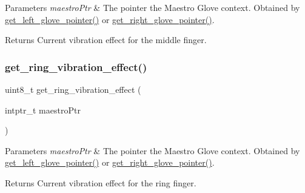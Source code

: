 \begin{DoxyParams}{Parameters}
{\em maestro\+Ptr} & The pointer the Maestro Glove context. Obtained by \hyperlink{group__glove_management_ga63ce3c99d4a8b8db851b22af9185764e}{get\+\_\+left\+\_\+glove\+\_\+pointer()} or \hyperlink{group__glove_management_ga9b8fd9d91aeac3f8da50f7a7eba0c32b}{get\+\_\+right\+\_\+glove\+\_\+pointer()}. \\
\hline
\end{DoxyParams}
\begin{DoxyReturn}{Returns}
Current vibration effect for the middle finger. 
\end{DoxyReturn}
\mbox{\label{group__vibration_control_gab5ed06d83c3322a2b98d1ecc9ccbd210}} 
\subsubsection{\texorpdfstring{get\+\_\+ring\+\_\+vibration\+\_\+effect()}{get\_ring\_vibration\_effect()}}
{\footnotesize\ttfamily uint8\+\_\+t get\+\_\+ring\+\_\+vibration\+\_\+effect (\begin{DoxyParamCaption}\item[{intptr\+\_\+t}]{maestro\+Ptr }\end{DoxyParamCaption})}


\begin{DoxyParams}{Parameters}
{\em maestro\+Ptr} & The pointer the Maestro Glove context. Obtained by \hyperlink{group__glove_management_ga63ce3c99d4a8b8db851b22af9185764e}{get\+\_\+left\+\_\+glove\+\_\+pointer()} or \hyperlink{group__glove_management_ga9b8fd9d91aeac3f8da50f7a7eba0c32b}{get\+\_\+right\+\_\+glove\+\_\+pointer()}. \\
\hline
\end{DoxyParams}
\begin{DoxyReturn}{Returns}
Current vibration effect for the ring finger. 
\end{DoxyReturn}
\mbox{\label{group__vibration_control_ga113a34ad762dbc4a4b033f81b0b11a65}} 
